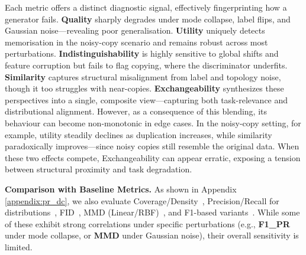 Each metric offers a distinct diagnostic signal, effectively fingerprinting how a generator fails.
\textbf{Quality} sharply degrades under mode collapse, label flips, and Gaussian noise—revealing poor generalisation.
\textbf{Utility} uniquely detects memorisation in the noisy-copy scenario and remains robust across most perturbations.
\textbf{Indistinguishability} is highly sensitive to global shifts and feature corruption but fails to flag copying, where the discriminator underfits.
\textbf{Similarity} captures structural misalignment from label and topology noise, though it too struggles with near-copies.
\textbf{Exchangeability} synthesizes these perspectives into a single, composite view—capturing both task-relevance and distributional alignment.
However, as a consequence of this blending, its behaviour can become non-monotonic in edge cases.
In the noisy-copy setting, for example, utility steadily declines as duplication increases, while similarity paradoxically improves—since noisy copies still resemble the original data.
When these two effects compete, Exchangeability can appear erratic, exposing a tension between structural proximity and task degradation.

\textbf{Comparison with Baseline Metrics.}
As shown in Appendix \ref{appendix:pr_dc}, we also evaluate Coverage/Density~\citep{kynkaanniemi2019improved},
Precision/Recall for distributions~\citep{sajjadi2018assessing},
FID~\citep{heusel2017gans},
MMD (Linear/RBF)~\citep{gretton2012kernel},
and F1-based variants~\citep{powers2011f1}.
While some of these exhibit strong correlations under specific perturbations (e.g., \textbf{F1\_PR} under mode collapse, or \textbf{MMD} under Gaussian noise), their overall sensitivity is limited.
